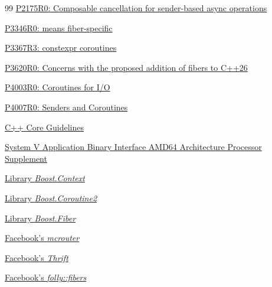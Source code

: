\begin{thebibliography}{99}
        \href{https://www.open-std.org/jtc1/sc22/wg21/docs/papers/2020/p2175r0.html}
        {P2175R0: Composable cancellation for sender-based async operations}

        \href{https://www.open-std.org/jtc1/sc22/wg21/docs/papers/2024/p3346r0.pdf}
        {P3346R0: \tlocal means fiber-specific}

        \href{https://www.open-std.org/jtc1/sc22/wg21/docs/papers/2025/p3367r3.html}
        {P3367R3: constexpr coroutines}

        \href{https://isocpp.org/files/papers/P3620R0.pdf}
        {P3620R0: Concerns with the proposed addition of fibers to C++26}

        \href{https://wg21.link/p4003}
        {P4003R0: Coroutines for I/O}

        \href{https://wg21.link/p4007}
        {P4007R0: Senders and Coroutines}

        \href{http://isocpp.github.io/CppCoreGuidelines/CppCoreGuidelines#Ri-global}
        {C++ Core Guidelines}

        \href{http://software.intel.com/sites/default/files/article/402129/mpx-linux64-abi.pdf}
        {System V Application Binary Interface AMD64 Architecture Processor
        Supplement}

        \href{http://www.boost.org/doc/libs/release/libs/context/doc/html/index.html}
        {Library \emph{Boost.Context}}

        \href{http://www.boost.org/doc/libs/release/libs/coroutine2/doc/html/index.html}
        {Library \emph{Boost.Coroutine2}}

        \href{http://www.boost.org/doc/libs/release/libs/fiber/doc/html/index.html}
        {Library \emph{Boost.Fiber}}

        \href{https://code.facebook.com/posts/296442737213493/introducing-mcrouter-a-memcached-protocol-router-for-scaling-memcached-deployments}
        {Facebook's \emph{mcrouter}}

        \href{https://github.com/facebook/fbthrift}
        {Facebook's \emph{Thrift}}

        \href{https://github.com/facebook/folly/tree/master/folly/fibers}
        {Facebook's \emph{folly::fibers}}


\end{thebibliography}
